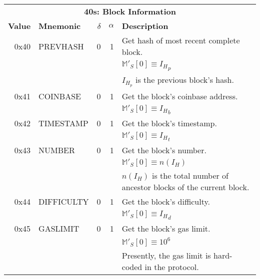 \documentclass[9pt,oneside]{amsart}
\begin{document}
\begin{tabular*}{\columnwidth}[h]{rlrrl}
\toprule
\multicolumn{5}{c}{\textbf{40s: Block Information}} \vspace{5pt} \\
\textbf{Value} & \textbf{Mnemonic} & $\delta$ & $\alpha$ & \textbf{Description} \vspace{5pt} \\
0x40 & {\small PREVHASH} & 0 & 1 & Get hash of most recent complete block. \\
&&&& $\mathbb{M}'_S[0] \equiv {I_H}_p$ \\
&&&& $I_{H_p}$ is the previous block's hash. \\
\midrule
0x41 & {\small COINBASE} & 0 & 1 & Get the block's coinbase address. \\
&&&& $\mathbb{M}'_S[0] \equiv {I_H}_b$ \\
\midrule
0x42 & {\small TIMESTAMP} & 0 & 1 & Get the block's timestamp. \\
&&&& $\mathbb{M}'_S[0] \equiv {I_H}_t$ \\
\midrule
0x43 & {\small NUMBER} & 0 & 1 & Get the block's number. \\
&&&& $\mathbb{M}'_S[0] \equiv n({I_H})$ \\
&&&& $n(I_H)$ is the total number of ancestor blocks of the current block. \\
\midrule
0x44 & {\small DIFFICULTY} & 0 & 1 & Get the block's difficulty. \\
&&&& $\mathbb{M}'_S[0] \equiv {I_H}_d$ \\
\midrule
0x45 & {\small GASLIMIT} & 0 & 1 & Get the block's gas limit. \\
&&&& $\mathbb{M}'_S[0] \equiv 10^6$ \\
&&&& Presently, the gas limit is hard-coded in the protocol. \\
\bottomrule
\end{tabular*}
\end{document}
